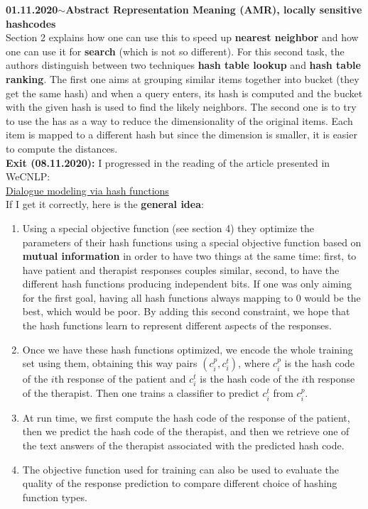 \documentclass[11pt,a4paper]{article}
\newenvironment{loggentry}[2]%
{\noindent\textbf{#1}\hspace{1cm}$\mathbf{\sim}$\text{ }\textbf{#2}\\}{\vspace{0.5cm}}
\begin{document}
\begin{loggentry}{01.11.2020}{Abstract Representation Meaning (AMR), locally sensitive hashcodes}
Section 2 explains how one can use this to speed up \textbf{nearest neighbor} and how one can use it for \textbf{search} (which is not so different). For this second task, the authors distinguish between two techniques \textbf{hash table lookup} and \textbf{hash table ranking}. The first one aims at grouping similar items together into bucket (they get the same hash) and when a query enters, its hash is computed and the bucket with the given hash is used to find the likely neighbors. The second one is to try to use the has as a way to reduce the dimensionality of the original items. Each item is mapped to a different hash but since the dimension is smaller, it is easier to compute the distances.\\
\textbf{Exit (08.11.2020):} I progressed in the reading of the article presented in WeCNLP:\\
\href{http://ceur-ws.org/Vol-2202/paper4.pdf}{Dialogue modeling via hash functions}\\
If I get it correctly, here is the \textbf{general idea}:\\
\begin{enumerate}
\item Using a special objective function (see section 4) they optimize the parameters of their hash functions using a special objective function based on \textbf{mutual information} in order to have two things at the same time: first, to have patient and therapist responses couples similar, second, to have the different hash functions producing independent bits. If one was only aiming for the first goal, having all hash functions always mapping to 0 would be the best, which would be poor. By adding this second constraint, we hope that the hash functions learn to represent different aspects of the responses.
\item Once we have these hash functions optimized, we encode the whole training set using them, obtaining this way pairs $(c^p_i, c^t_i)$, where $c^p_i$ is the hash code of the $i$th response of the patient and $c^t_i$ is the hash code of the $i$th response of the therapist. Then one trains a classifier to predict $c^t_i$ from $c^p_i$.
\item At run time, we first compute the hash code of the response of the patient, then we predict the hash code of the therapist, and then we retrieve one of the text answers of the therapist associated with the predicted hash code.
\item The objective function used for training can also be used to evaluate the quality of the response prediction to compare different choice of hashing function types.

\end{enumerate}
\end{loggentry}
\end{document}
